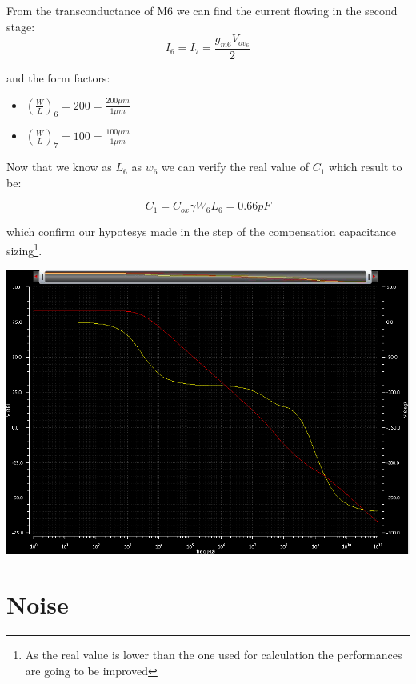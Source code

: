 From the transconductance of M6 we can find the current flowing in the second stage:
\begin{equation}
  I_6=I_7= \frac{g_{m6}V_{ov_6}}{2}
\end{equation}

and the form factors:

\begin{itemize}
    \item $(\frac{W}{L})_6=200=\frac{200 \mu m}{1 \mu m}$
 
    \item $(\frac{W}{L})_7=100=\frac{100 \mu m}{1 \mu m}$
    
  \end{itemize}  

Now that we know as $L_6$ as $w_6$ we can verify the real value of $C_1$ which result to be:

\begin{equation}
  C_1 = C_{ox} \gamma W_6 L_6 = 0.66pF
\end{equation}

which confirm our hypotesys made in the step of the compensation capacitance sizing\footnote{As the real value is lower than the one used for calculation the performances are going to be improved}.

\centering
\includegraphics[width=1\textwidth]{Capitoli/gainph1.png}
\raggedright




\section{Noise} %
\label{sec:noise}


